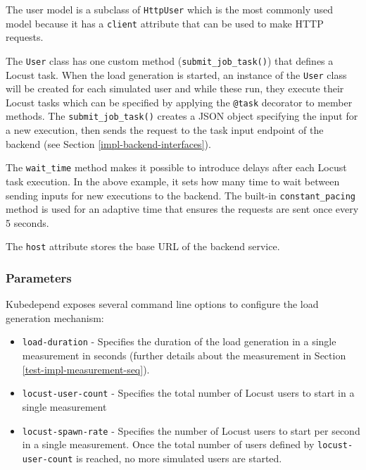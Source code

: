 The user model is a subclass of \texttt{HttpUser} which is the most commonly used model because it has a \texttt{client} attribute that can be used to make HTTP requests.

The \texttt{User} class has one custom method (\texttt{submit\_job\_task()}) that defines a Locust task. When the load generation is started, an instance of the \texttt{User} class will be created for each simulated user and while these run, they execute their Locust tasks which can be specified \eg by applying the \texttt{@task} decorator to member methods. The \texttt{submit\_job\_task()} creates a JSON object specifying the input for a new execution, then sends the request to the task input endpoint of the backend (see Section \ref{impl-backend-interfaces}).

The \texttt{wait\_time} method makes it possible to introduce delays after each Locust task execution. In the above example, it sets how many time to wait between sending inputs for new executions to the backend. The built-in \texttt{constant\_pacing} method is used for an adaptive time that ensures the requests are sent once every 5 seconds.

The \texttt{host} attribute stores the base URL of the backend service.

\subsubsection{Parameters}

Kubedepend exposes several command line options to configure the load generation mechanism:

\begin{itemize}
	\item \texttt{load-duration} - Specifies the duration of the load generation in a single measurement in seconds (further details about the measurement in Section \ref{test-impl-measurement-seq}). 
	\item \texttt{locust-user-count} - Specifies the total number of Locust users to start in a single measurement
	\item \texttt{locust-spawn-rate} - Specifies the number of Locust users to start per second in a single measurement. Once the total number of users defined by \texttt{locust-user-count} is reached, no more simulated users are started. 
\end{itemize}

